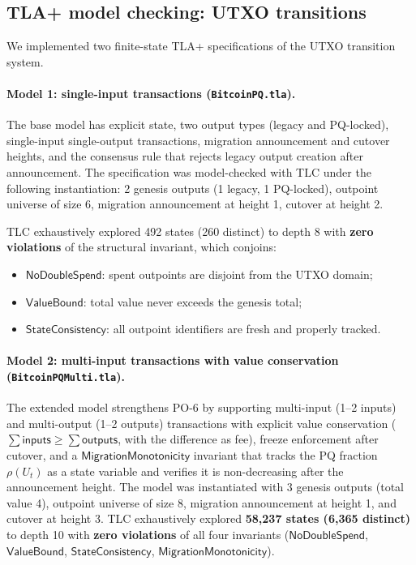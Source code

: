 \documentclass[11pt]{article}
\begin{document}
\subsection{TLA+ model checking: UTXO transitions}\label{sec:tlc-results}

We implemented two finite-state TLA+ specifications of the UTXO transition system.

\paragraph{Model 1: single-input transactions (\texttt{BitcoinPQ.tla}).}
The base model has explicit state, two output types (legacy and PQ-locked), single-input single-output transactions, migration announcement and cutover heights, and the consensus rule that rejects legacy output creation after announcement.
The specification was model-checked with TLC under the following instantiation: 2 genesis outputs (1 legacy, 1 PQ-locked), outpoint universe of size 6, migration announcement at height 1, cutover at height 2.

TLC exhaustively explored 492 states (260 distinct) to depth 8 with \textbf{zero violations} of the structural invariant, which conjoins:
\begin{itemize}[leftmargin=2em]
  \item $\textsf{NoDoubleSpend}$: spent outpoints are disjoint from the UTXO domain;
  \item $\textsf{ValueBound}$: total value never exceeds the genesis total;
  \item $\textsf{StateConsistency}$: all outpoint identifiers are fresh and properly tracked.
\end{itemize}

\paragraph{Model 2: multi-input transactions with value conservation (\texttt{BitcoinPQMulti.tla}).}
The extended model strengthens PO-6 by supporting multi-input (1--2 inputs) and multi-output (1--2 outputs) transactions with explicit value conservation ($\sum\textsf{inputs} \ge \sum\textsf{outputs}$, with the difference as fee), freeze enforcement after cutover, and a $\textsf{MigrationMonotonicity}$ invariant that tracks the PQ fraction $\rho(U_t)$ as a state variable and verifies it is non-decreasing after the announcement height.
The model was instantiated with 3 genesis outputs (total value 4), outpoint universe of size 8, migration announcement at height 1, and cutover at height 3.
TLC exhaustively explored \textbf{58{,}237 states (6{,}365 distinct)} to depth 10 with \textbf{zero violations} of all four invariants ($\textsf{NoDoubleSpend}$, $\textsf{ValueBound}$, $\textsf{StateConsistency}$, $\textsf{MigrationMonotonicity}$).
\end{document}
